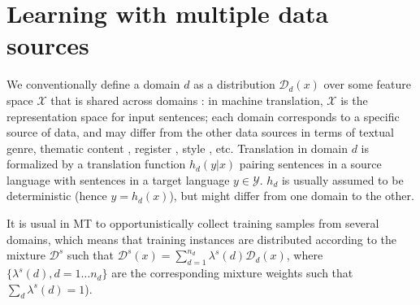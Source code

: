 \documentclass[11pt,a4paper]{article}
\begin{document}

\section{Learning with multiple data sources} \label{sec:mdmt}

We conventionally define a domain $d$ as a distribution $\mathcal{D}_d(x)$ over some feature space $\mathcal{X}$ that is shared across domains \citep{Pan10asurvey}: in machine translation, $\mathcal{X}$ is the representation space for input sentences; each domain corresponds to a specific source of data, and may differ from the other data sources in terms of textual genre, thematic content \cite{Chen16guided,Zhang16topicinformed}, register \cite{Sennrich16politeness}, style \cite{Niu18multitask}, etc. Translation in domain $d$ is formalized by a translation function $h_d(y|x)$ pairing sentences in a source language with sentences in a target language $y \in \mathcal{Y}$. $h_d$ is usually assumed to be deterministic (hence $y = h_d(x)$), but might differ from one domain to the other.

It is usual in MT to opportunistically collect training samples from several domains, which means that training instances are distributed according to the mixture $\mathcal{D}^s$ such that $\mathcal{D}^s(x) = \sum_{d=1}^{n_d} \lambda^{s}(d) \mathcal{D}_d(x)$, where $\{\lambda^{s}(d), d=1 \dots n_d\}$ are the corresponding mixture weights such that $\sum_d \lambda^{s}(d)=1$).
\end{document}
